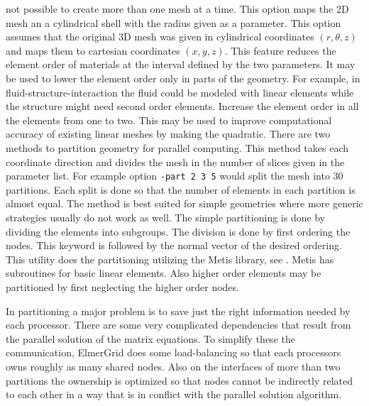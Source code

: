 not possible to create more than one mesh at a time.
%
This option maps the 2D mesh an a cylindrical shell with the radius
given as a parameter.
%
This option assumes that the original 3D mesh was given in 
cylindrical coordinates $(r,\theta,z)$ and maps them to cartesian 
coordinates $(x,y,z)$.
%
This feature reduces the element order of materials at the interval
defined by the two parameters. It may be used to lower the element order 
only in parts of the geometry. For example, in fluid-structure-interaction the 
fluid could be modeled with linear elements while the 
structure might need second order elements.
%
Increase the element order in all the elements from one to two.
This may be used to improve computational accuracy of existing 
linear meshes by making the quadratic.
%
%
There are two methods to partition geometry for parallel computing. This
method takes each coordinate direction and divides the mesh in the number
of slices given in the parameter list. For example option
\texttt{-part 2 3 5} would split the mesh into 30 partitions. 
Each split is done so that the number of elements in each partition
is almost equal. The method is best suited for simple geometries 
where more generic strategies usually do not work as well.
%
The simple partitioning is done by dividing the elements
into subgroups. The division is done by first ordering the nodes. This
keyword is followed by the normal vector of the desired ordering.
%
This utility does the partitioning utilizing the Metis library, see
. Metis has subroutines
for basic linear elements. Also higher order elements may be partitioned
by first neglecting the higher order nodes.

In partitioning a major problem is to save just the right information
needed by each processor. There are some very complicated dependencies that
result from the parallel solution of the matrix equations. To simplify these
the communication, ElmerGrid does some load-balancing so that each processors
owns roughly as many shared nodes. Also on the interfaces of more than two
partitions the ownership is optimized so that nodes cannot be 
indirectly related to each other in a way that is in conflict with 
the parallel solution algorithm. 


